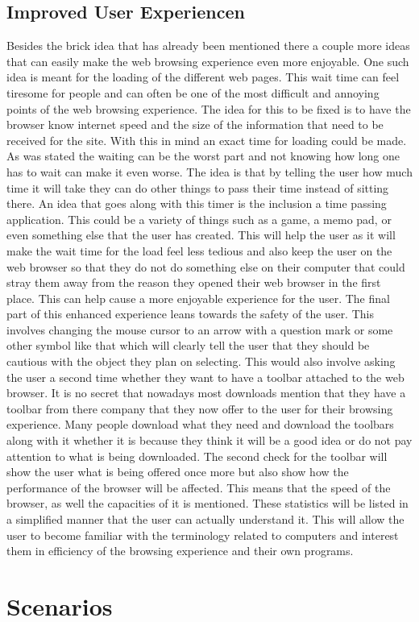 \documentclass[11pt]{article}
\begin{document}
\subsection{Improved User Experiencen}
Besides the brick idea that has already been mentioned there a couple more ideas that can easily make the web browsing experience even more enjoyable. One such idea is meant for the loading of the different web pages. This wait time can feel tiresome for people and can often be one of the most difficult and annoying points of the web browsing experience. The idea for this to be fixed is to have the browser know internet speed and the size of the information that need to be received for the site. With this in mind an exact time for loading could be made. As was stated the waiting can be the worst part and not knowing how long one has to wait can make it even worse. The idea is that by telling the user how much time it will take they can do other things to pass their time instead of sitting there. An idea that goes along with this timer is the inclusion a time passing application. This could be a variety of things such as a game, a memo pad, or even something else that the user has created. This will help the user as it will make the wait time for the load feel less tedious and also keep the user on the web browser so that they do not do something else on their computer that could stray them away from the reason they opened their web browser in the first place. This can help cause a more enjoyable experience for the user. The final part of this enhanced experience leans towards the safety of the user. This involves changing the mouse cursor to an arrow with a question mark or some other symbol like that which will clearly tell the user that they should be cautious with the object they plan on selecting. This would also involve asking the user a second time whether they want to have a toolbar attached to the web browser. It is no secret that nowadays most downloads mention that they have a toolbar from there company that they now offer to the user for their browsing experience. Many people download what they need and download the toolbars along with it whether it is because they think it will be a good idea or do not pay attention to what is being downloaded. The second check for the toolbar will show the user what is being offered once more but also show how the performance of the browser will be affected. This means that the speed of the browser, as well the capacities of it is mentioned. These statistics will be listed in a simplified manner that the user can actually understand it. This will allow the user to become familiar with the terminology related to computers and interest them in efficiency of the browsing experience and their own programs.

\section{Scenarios}


\end{document}
